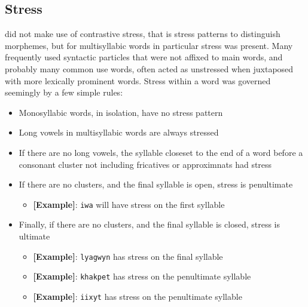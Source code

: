   \subsection{Stress}
  \langname did not make use of contrastive stress, that is stress patterns to distinguish morphemes, but for multisyllabic words in particular stress was present. Many frequently used syntactic particles that were not affixed to main words, and probably many common use words, often acted as unstressed when juxtaposed with more lexically prominent words. Stress within a word was governed seemingly by a few simple rules:\par
  \begin{itemize}
    \item Monosyllabic words, in isolation, have no stress pattern
    \item Long vowels in multisyllabic words are always stressed
    \item If there are no long vowels, the syllable closeset to the end of a word before a consonant cluster not including fricatives or approximnats had stress
    \begin{itemize}
      \item\textbf{[Example]}: \texttt{saktu} will have stress on the first syllable}
    \end{itemize}
    \item If there are no clusters, and the final syllable is open, stress is penultimate
    \begin{itemize}
      \item\textbf{[Example]}: \texttt{iwa} will have stress on the first syllable
    \end{itemize}
    \item Finally, if there are no clusters, and the final syllable is closed, stress is ultimate
    \begin{itemize}
      \item\textbf{[Example]}: \texttt{lyagwyn} has stress on the final syllable
      \item\textbf{[Example]}: \texttt{khakpet} has stress on the penultimate syllable
      \item\textbf{[Example]}: \texttt{iixyt} has stress on the penultimate syllable
    \end{itemize}
  \end{itemize}
